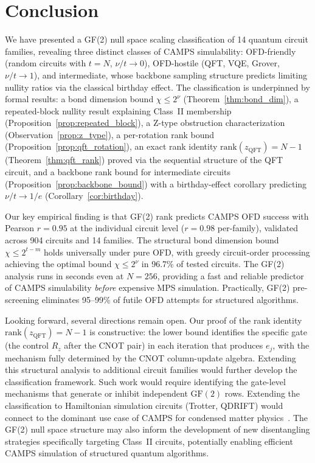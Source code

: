 \documentclass[a4paper,twocolumn,11pt]{quantumarticle}
\begin{document}
\section{Conclusion}
\label{sec:conclusion}

We have presented a GF(2) null space scaling classification of 14 quantum circuit families, revealing three distinct classes of CAMPS simulability: OFD-friendly (random circuits with $t = N$, $\nu/t \to 0$), OFD-hostile (QFT, VQE, Grover, $\nu/t \to 1$), and intermediate, whose backbone sampling structure predicts limiting nullity ratios via the classical birthday effect.
The classification is underpinned by formal results: a bond dimension bound $\chi \le 2^{\nu}$ (Theorem~\ref{thm:bond_dim}), a repeated-block nullity result explaining Class~II membership (Proposition~\ref{prop:repeated_block}), a Z-type obstruction characterization (Observation~\ref{prop:z_type}), a per-rotation rank bound (Proposition~\ref{prop:qft_rotation}), an exact rank identity $\mathrm{rank}(z_{\mathrm{QFT}}) = N - 1$ (Theorem~\ref{thm:qft_rank}) proved via the sequential structure of the QFT circuit, and a backbone rank bound for intermediate circuits (Proposition~\ref{prop:backbone_bound}) with a birthday-effect corollary predicting $\nu/t \to 1/e$ (Corollary~\ref{cor:birthday}).

Our key empirical finding is that GF(2) rank predicts CAMPS OFD success with Pearson $r = 0.95$ at the individual circuit level ($r = 0.98$ per-family), validated across 904 circuits and 14 families.
The structural bond dimension bound $\chi \le 2^{t-m}$ holds universally under pure OFD, with greedy circuit-order processing achieving the optimal bound $\chi \le 2^\nu$ in 96.7\% of tested circuits.
The GF(2) analysis runs in seconds even at $N = 256$, providing a fast and reliable predictor of CAMPS simulability \emph{before} expensive MPS simulation.
Practically, GF(2) pre-screening eliminates 95--99\% of futile OFD attempts for structured algorithms.

Looking forward, several directions remain open.
Our proof of the rank identity $\mathrm{rank}(z_{\mathrm{QFT}}) = N - 1$ is constructive: the lower bound identifies the specific gate (the control $R_z$ after the CNOT pair) in each iteration that produces $e_j$, with the mechanism fully determined by the CNOT column-update algebra.
Extending this structural analysis to additional circuit families would further develop the classification framework. Such work would require identifying the gate-level mechanisms that generate or inhibit independent $\mathrm{GF}(2)$ rows.
Extending the classification to Hamiltonian simulation circuits (Trotter, QDRIFT) would connect to the dominant use case of CAMPS for condensed matter physics~\cite{Qian2024,MelloTDVP2025}.
The GF(2) null space structure may also inform the development of new disentangling strategies specifically targeting Class~II circuits, potentially enabling efficient CAMPS simulation of structured quantum algorithms.
\end{document}
